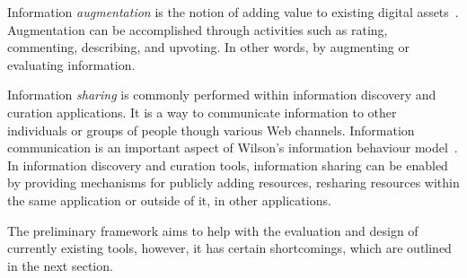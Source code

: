 {Information \textit{augmentation} is the notion of adding value to existing digital assets~\cite{beagrie2008digital}. Augmentation can be accomplished through activities such as rating, commenting, describing, and upvoting. In other words, by augmenting or evaluating information.  

Information \textit{sharing} is commonly performed within information discovery and curation applications. It is a way to communicate information to other individuals or groups of people though various Web channels. Information communication is an important aspect of Wilson's information behaviour model~\cite{wilson1981user}. In information discovery and curation tools, information sharing can be enabled by providing mechanisms for publicly adding resources, resharing resources within the same application or outside of it, in other applications.

The preliminary framework aims to help with the evaluation and design of currently existing tools, however, it has certain shortcomings, which are outlined in the next section.

} %
